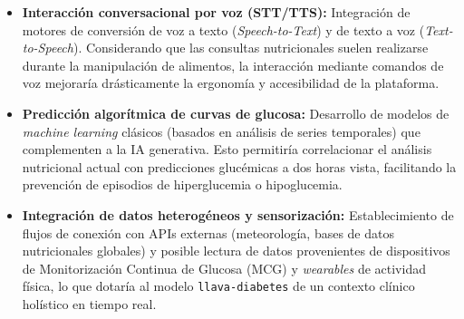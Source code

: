 \begin{itemize}
    \item \textbf{Interacción conversacional por voz (STT/TTS):} Integración de motores de conversión de voz a texto (\textit{Speech-to-Text}) y de texto a voz (\textit{Text-to-Speech}). Considerando que las consultas nutricionales suelen realizarse durante la manipulación de alimentos, la interacción mediante comandos de voz mejoraría drásticamente la ergonomía y accesibilidad de la plataforma.
    \item \textbf{Predicción algorítmica de curvas de glucosa:} Desarrollo de modelos de \textit{machine learning} clásicos (basados en análisis de series temporales) que complementen a la IA generativa. Esto permitiría correlacionar el análisis nutricional actual con predicciones glucémicas a dos horas vista, facilitando la prevención de episodios de hiperglucemia o hipoglucemia.
    \item \textbf{Integración de datos heterogéneos y sensorización:} Establecimiento de flujos de conexión con APIs externas (meteorología, bases de datos nutricionales globales) y posible lectura de datos provenientes de dispositivos de Monitorización Continua de Glucosa (MCG) y \textit{wearables} de actividad física, lo que dotaría al modelo \texttt{llava-diabetes} de un contexto clínico holístico en tiempo real.
\end{itemize}

